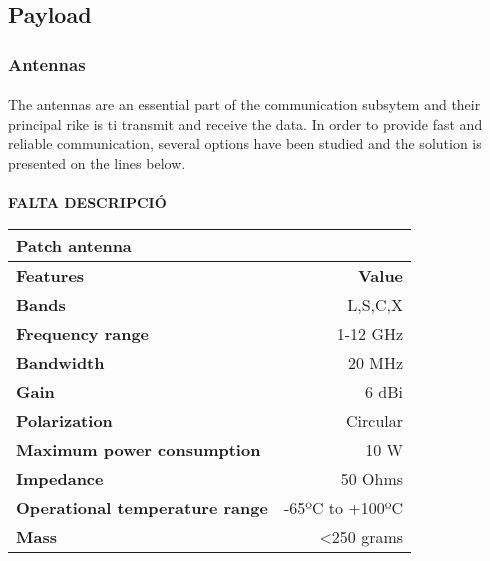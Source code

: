 \subsection{Payload}

\subsubsection{Antennas}
 
\paragraph{}The antennas are an essential part of the communication subsytem and their principal rike is ti transmit and receive the data. In order to provide fast and reliable communication, several options have been studied and the solution is presented on the lines below.


\paragraph{} \textbf{FALTA DESCRIPCIÓ}

\begin{longtable}{| l | r |}

\hline
\rowcolor[gray]{0.60}	\textbf{Patch antenna} \\
\hline

\hline
\rowcolor[gray]{0.75}	\textbf{Features} &  \textbf{Value}   \\
\hline

\cellcolor[gray]{0.85} \textbf{Bands} & L,S,C,X  \\
\cellcolor[gray]{0.85} \textbf{Frequency range} & 1-12 GHz  \\
\cellcolor[gray]{0.85} \textbf{Bandwidth} & 20 MHz \\
\cellcolor[gray]{0.85} \textbf{Gain} & 6 dBi  \\
\cellcolor[gray]{0.85} \textbf{Polarization} & Circular \\
\cellcolor[gray]{0.85} \textbf{Maximum power consumption} & 10 W \\
\cellcolor[gray]{0.85} \textbf{Impedance} & 50 Ohms \\
\cellcolor[gray]{0.85} \textbf{Operational temperature range} & -65ºC to +100ºC \\
\cellcolor[gray]{0.85} \textbf{Mass} & <250 grams \\
\hline

\end{longtable}


